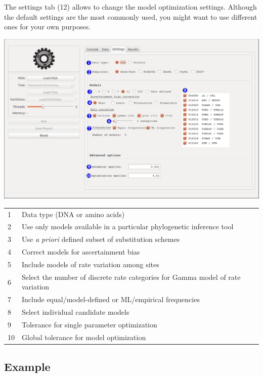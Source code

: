 \documentclass[10pt,twoside,a4paper]{article}
\begin{document}
The settings tab ({\color{RedOrange}12}) allows to change the model optimization settings.
Although the default settings are the most commonly used, you might want to use different ones for your own purposes.

\begin{center}
\includegraphics[width=.9\textwidth]{images/lkl-settings}
\end{center}

\begin{tabular}{l p{}}
  \color{Blue}1  & Data type (DNA or amino acids) \\
  \color{Blue}2  & Use only models available in a particular phylogenetic inference tool \\
  \color{Blue}3  & Use \emph{a priori} defined subset of substitution schemes \\
  \color{Blue}4  & Correct models for ascertainment bias \\
  \color{Blue}5  & Include models of rate variation among sites \\
  \color{Blue}6  & Select the number of discrete rate categories for Gamma model of rate variation \\
  \color{Blue}7  & Include equal/model-defined or ML/empirical frequencies \\
  \color{Blue}8  & Select individual candidate models \\
  \hline
  \color{Blue}9  & Tolerance for single parameter optimization \\
  \color{Blue}10 & Global tolerance for model optimization \\
\end{tabular}

\subsection{Example}
\end{document}
